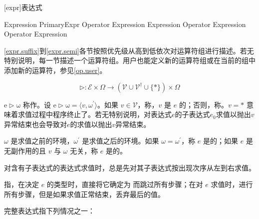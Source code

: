 
[expr]{表达式}

\begin{bnf}{Expression}
    PrimaryExpr \br
    Operator Expression \br
    Expression Operator \br
    Expression Operator Expression
\end{bnf}


\pnum
\ref{expr.suffix}到\ref{expr.semi}各节按照优先级从高到低依次对运算符组进行描述。若无特别说明，每一节描述一个运算符组。用户也能定义新的运算符组或在当前的组中添加新的运算符，参见\ref{op.user}。

$$ \mathrm{\rhd}: \mathcal{E} \times \Omega \rightarrow (\mathcal{V} \cup \mathcal{V}^\dag \cup \{\ast\}) \times \Omega $$

\pnum
$\mathrm{e \rhd \omega}$ 称作。设 $\mathrm{e \rhd \omega} = \langle v, \omega^\prime \rangle$。如果 $v \in \mathcal{V}$，称，$v$ 是 $e$ 的；否则，称。$v = \ast$ 意味着求值过程中程序终止了。若无特别说明，对表达式$e$的子表达式$e_0$求值以抛出$v$异常结束也会导致对$e$的求值以抛出$v$异常结束。

\pnum
$\omega$ 是求值之前的环境，$\omega^\prime$ 是求值之后的环境。如果 $\omega = \omega^\prime$，称 $e$ 是的；如果 $e$ 是无副作用的且 $v$ 与 $\omega$ 无关，称 $e$ 是的。

\pnum
对含有子表达式的表达式求值时，总是先对其子表达式按出现次序从左到右求值。

\pnum
{}指，在决定 $e$ 的类型时，直接将它确定为  而跳过所有步骤；在对 $e$ 求值时，进行所有步骤，但是如果求值正常结束，丢弃最后的值。

\pnum
完整表达式指下列情况之一：

